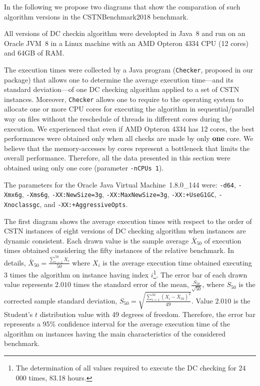 \documentclass[a4paper,11pt]{article}
\begin{document}
In the following we propose two diagrams that show the comparation of such algorithm versions in the CSTNBenchmark2018 benchmark.

All versions of DC checkin algorithm were developted in Java~8 and run on an Oracle JVM~8 in a Linux machine with an AMD Opteron 4334
CPU (12 cores) and 64GB of RAM.

The execution times were collected by a Java program (\texttt{Checker}, proposed in our package) that allows one to determine the average execution time---and its standard deviation---of one DC checking algorithm applied to a set of CSTN instances. Moreover,  \texttt{Checker} allows one to require to the operating system to allocate one or more
CPU cores for executing the algorithm in sequential/parallel way on files without the reschedule of threads in different cores during the execution.
We experienced that even if AMD Opteron 4334 has 12 cores, the best performances were obtained only when all checks are made by only \textbf{one} core.
We believe that the memory-accesses by cores represent a bottleneck that limits the overall performance.
Therefore, all the data presented in this section were obtained using only one core (parameter \texttt{-nCPUs 1}).

The parameters for the Oracle Java Virtual Machine~1.8.0\_144 were: \texttt{-d64}, \texttt{-Xmx6g}, \texttt{-Xms6g}, \texttt{-XX:NewSize=3g}, \texttt{-XX:MaxNewSize=3g}, \texttt{-XX:+UseG1GC}, \texttt{-Xnoclassgc}, and \texttt{-XX:+AggressiveOpts}. 

The first diagram shows the average execution times with respect to the order of CSTN instances of eight versions of DC checking algorithm when instances are dynamic consistent. 
Each drawn value is the sample average $\bar{X}_{50}$ of execution times obtained considering the fifty instances of the relative benchmark. 
In details, $\bar{X}_{50}=\frac{\sum_{i=1}^{50} X_i}{50}$ where $X_i$ is the average execution time obtained executing 3 times the algorithm on instance having index $i$\footnote{The determination of all values required to execute the DC checking for 24 000 times, 83.18 hours.}.
The error bar of each drawn value represents $2.010$ times the standard error of the mean, $\frac{S_{50}}{\sqrt{50}}$, where $S_{50}$ is the corrected sample standard deviation, $S_{50}= \sqrt{\frac{\sum_{i=1}^{50} (X_i-\bar{X}_{50})^2}{49}}$. Value $2.010$ is the Student's $t$ distribution value with 49 degrees of freedom. 
Therefore, the error bar represents a 95\% confidence interval for the average execution time of the algorithm on instances having the main characteristics of the considered benchmark.
\end{document}
